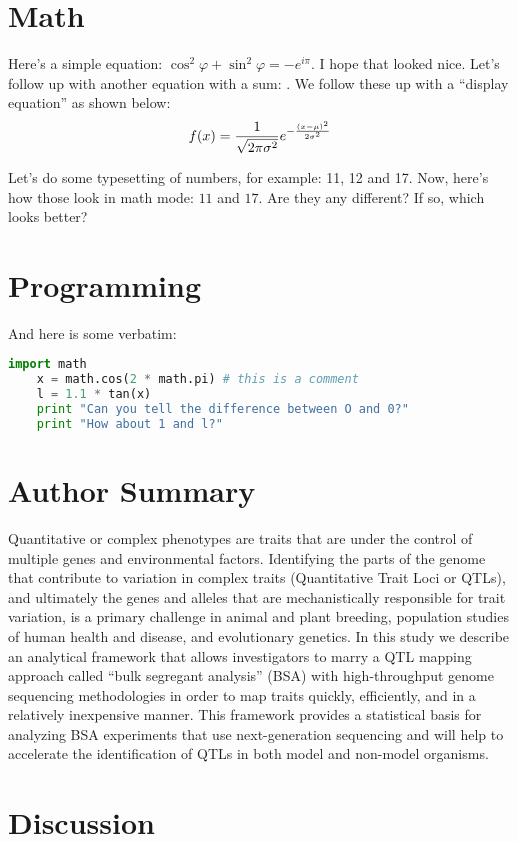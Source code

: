\section{Math}

Here's a simple equation: $\cos^2 \varphi + \sin^2 \varphi = -e^{i\pi}$. I hope that looked nice. Let's follow up with another equation with a sum: \varx. We follow these up with a ``display equation'' as shown below:
\[
 f(x) = \frac{1}{\sqrt{2\pi\sigma^2}} e^{-\frac{(x-\mu)^2}{2\sigma^2}} 
\]

Let's do some typesetting of numbers, for example: 11, 12 and 17. Now, here's
how those look in math mode: $11$ and $17$. Are they any different? If so,
which looks better?

\section{Programming}

And here is some verbatim:

\begin{lstlisting}[language=Python]
    import math
    x = math.cos(2 * math.pi) # this is a comment
    l = 1.1 * tan(x)
    print "Can you tell the difference between O and 0?"
    print "How about 1 and l?"
\end{lstlisting}  


\section{Author Summary}
Quantitative or complex phenotypes are traits that are under the control of multiple genes and environmental factors.  Identifying the parts of the genome that contribute to variation in complex traits (Quantitative Trait Loci or QTLs), and ultimately the genes and alleles that are mechanistically responsible for trait variation, is a primary challenge in animal and plant breeding, population studies of human health and disease, and evolutionary genetics. In this study we describe an analytical framework that allows investigators to marry a QTL mapping approach called ``bulk segregant analysis'' (BSA) with high-throughput genome sequencing methodologies in order to map traits quickly, efficiently, and in a relatively inexpensive manner. This framework provides a statistical basis for analyzing BSA experiments that use next-generation sequencing and will help to accelerate the identification of QTLs in both model and non-model organisms.

\section{Discussion}

